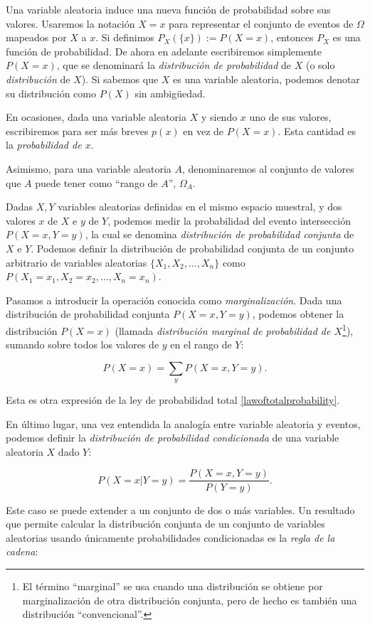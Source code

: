 Una variable aleatoria induce una nueva función de probabilidad sobre sus valores. Usaremos la notación $X=x$ para 
representar el conjunto de eventos de $\Omega$ mapeados por $X$ a $x$. Si definimos $P_X(\{x\}) := P(X=x)$, 
entonces $P_X$ es una función de probabilidad. De ahora en adelante escribiremos simplemente $P(X=x)$, que se 
denominará la {\em distribución de probabilidad} de $X$ (o solo {\em distribución} de $X$). Si sabemos que $X$ 
es una variable aleatoria, podemos denotar su distribución como $P(X)$ sin ambigüedad.

En ocasiones, dada una variable aleatoria $X$ y siendo $x$ uno de sus valores, escribiremos para ser más breves 
$p(x)$ en vez de $P(X=x)$. Esta cantidad es la {\em probabilidad de $x$}.

Asimismo, para una variable aleatoria $A$, denominaremos al conjunto de valores que $A$ puede tener como 
``rango de $A$'', $\Omega_A$.

Dadas $X,Y$ variables aleatorias definidas en el mismo espacio muestral, y dos valores $x$ de $X$ e $y$ de 
$Y$, podemos medir la probabilidad del evento intersección $P(X=x, Y=y)$, la cual se denomina {\em distribución 
de probabilidad conjunta} de $X$ e $Y$. Podemos definir la distribución de probabilidad conjunta de un conjunto 
arbitrario de variables aleatorias $\{X_1, X_2, \dots, X_n \}$ como $P(X_1=x_1, X_2=x_2,\dots, X_n=x_n )$.

Pasamos a introducir la operación conocida como {\em marginalización}. Dada una distribución de probabilidad 
conjunta $P(X=x,Y=y)$, podemos obtener la distribución $P(X=x)$ (llamada {\em distribución marginal de 
probabilidad de $X$}\footnote{El término ``marginal'' se usa cuando una distribución se obtiene por marginalización 
de otra distribución conjunta, pero de hecho es también una distribución ``convencional''.}), sumando sobre todos 
los valores de $y$ en el rango de $Y$: 

$$P(X=x) = \sum_y P(X=x, Y=y).$$

Esta es otra expresión de la ley de probabilidad total \ref{lawoftotalprobability}.

En último lugar, una vez entendida la analogía entre variable aleatoria y eventos, podemos definir la 
{\em distribución de probabilidad condicionada} de una variable aleatoria $X$ dado $Y$:

$$P(X=x|Y=y) = \frac{P(X=x, Y=y)}{P(Y=y)}.$$

Este caso se puede extender a un conjunto de dos o más variables. Un resultado que permite calcular la 
distribución conjunta de un conjunto de variables aleatorias usando únicamente probabilidades condicionadas 
es la {\em regla de la cadena}:

